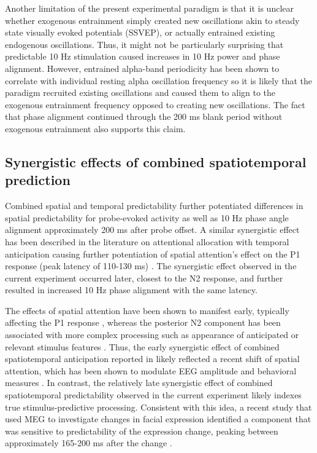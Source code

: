 \documentclass[dwyatte_dissertation.tex]{subfiles}
\begin{document}
Another limitation of the present experimental paradigm is that it is unclear whether exogenous entrainment simply created new oscillations akin to steady state visually evoked potentials (SSVEP), or actually entrained existing endogenous oscillations. Thus, it might not be particularly surprising that predictable 10 Hz stimulation caused increases in 10 Hz power and phase alignment. However, entrained alpha-band periodicity has been shown to correlate with individual resting alpha oscillation frequency  so it is likely that the paradigm recruited existing oscillations and caused them to align to the exogenous entrainment frequency opposed to creating new oscillations. The fact that phase alignment continued through the 200 ms blank period without exogenous entrainment also supports this claim.

\subsection{Synergistic effects of combined spatiotemporal prediction}
Combined spatial and temporal predictability further potentiated differences in spatial predictability for probe-evoked activity as well as 10 Hz phase angle alignment approximately 200 ms after probe offset. A similar synergistic effect has been described in the literature on attentional allocation with temporal anticipation causing further potentiation of spatial attention's effect on the P1 response (peak latency of 110-130 ms) \cite{DohertyRaoMesulamEtAl05}. The synergistic effect observed in the current experiment occurred later, closest to the N2 response, and further resulted in increased 10 Hz phase alignment with the same latency. 

The effects of spatial attention have been shown to manifest early, typically affecting the P1 response \cite{LuckHeinzeMangunEtAl90,HillyardAnllo-Vento98,HillyardVogelLuck98}, whereas the posterior N2 component has been associated with more complex processing such as appearance of anticipated or relevant stimulus features \cite{FolsteinVanPetten08}. Thus, the early synergistic effect of combined spatiotemporal anticipation reported in  likely reflected a recent shift of spatial attention, which has been shown to modulate EEG amplitude and behavioral measures \cite{BuschVanRullen10}. In contrast, the relatively late synergistic effect of combined spatiotemporal predictability observed in the current experiment likely indexes true stimulus-predictive processing. Consistent with this idea, a recent study that used MEG to investigate changes in facial expression identified a component that was sensitive to predictability of the expression change, peaking between approximately 165-200 ms after the change .
\end{document}
